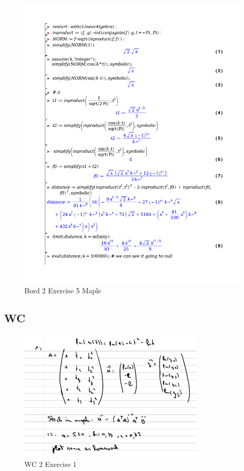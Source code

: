 \documentclass[a4paper]{report}
\begin{document}
\begin{figure}[H]
	\centering
	\includegraphics[width=\textwidth]{exercises/bord_2_ex_5.pdf}
	\caption{Bord 2 Exercise 5 Maple}
	\label{fig:bord_2_ex_5_maple}
\end{figure}

\subsection{WC}

\begin{figure}[H]
	\centering
	\includegraphics[width=0.8\textwidth]{images/wc_2_ex_1.png}
	\caption{WC 2 Exercise 1}
	\label{fig:wc_2_ex_1}
\end{figure}
\end{document}
